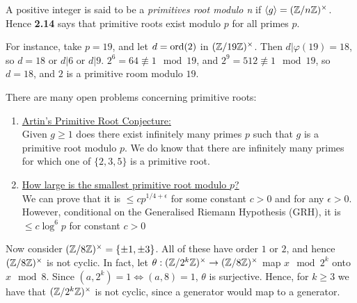 \documentclass[10pt,a4paper]{article}
\begin{document}
A positive integer is said to be a \emph{primitives root modulo n} if $\langle g \rangle = (\mathbb{Z}/n\mathbb{Z})^\times$. Hence \textbf{2.14} says that primitive roots exist modulo $p$ for all primes $p$.

For instance, take $p=19$, and let $d = \operatorname{ord}(2)$ in $(\mathbb{Z}/19\mathbb{Z})^\times$. Then $d|\varphi(19) = 18$, so $d=18$ or $d|6$ or $d|9$. $2^6 = 64 \nequiv 1 \mod 19$, and $2^9 = 512 \nequiv 1 \mod 19$, so $d=18$, and $2$ is a primitive room modulo $19$.

There are many open problems concerning primitive roots:
\begin{enumerate}
\item \underline{Artin's Primitive Root Conjecture:}\\
Given $g\geq 1$ does there exist infinitely many primes $p$ such that $g$ is a primitive root modulo $p$. We do know that there are infinitely many primes for which one of $\{2,3,5\}$ is a primitive root.
\item \underline{How large is the smallest primitive root modulo $p$?}\\
We can prove that it is $\leq cp^{1/4 + \epsilon}$ for some constant $c>0$ and for any $\epsilon > 0$. However, conditional on the Generalised Riemann Hypothesis (GRH), it is $\leq c\log^6 p$ for constant $c > 0$
\end{enumerate}

Now consider $(\mathbb{Z}/8\mathbb{Z})^\times = \{\pm 1, \pm 3\}$. All of these have order $1$ or $2$, and hence $(\mathbb{Z}/8\mathbb{Z})^\times$ is not cyclic. In fact, let $\theta: (\mathbb{Z}/2^k\mathbb{Z})^\times \rightarrow (\mathbb{Z}/8\mathbb{Z})^\times$ map $x \mod 2^k$ onto $x \mod 8$. Since $(a,2^k) =1 \iff (a,8) = 1$, $\theta$ is surjective. Hence, for $k\geq 3$ we have that $(\mathbb{Z}/2^k\mathbb{Z})^\times$ is not cyclic, since a generator would map to a generator.
\end{document}
